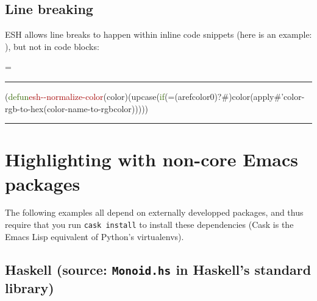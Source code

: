 \documentclass{article}
\makeatletter
\newcommand*{\ESHFontSize}{}
\newcommand*{\ESHFontFamily}{\ttfamily}
\newcommand*{\ESHInlineFontSize}{\ESHFontSize}
\newcommand*{\ESHInlineFontFamily}{\ESHFontFamily}
\newcommand*{\ESHInlineFont}{\ESHInlineFontSize\ESHInlineFontFamily}
\newcommand*{\ESHBlockFontSize}{\ESHFontSize}
\newcommand*{\ESHBlockFontFamily}{\ESHFontFamily}
\newcommand*{\ESHBlockFont}{\ESHBlockFontSize\ESHBlockFontFamily}
\newcommand*{\ESHFallbackFontFamily}{\ESHFontFamily}
\newcommand*{\ESHFallbackFont}{\ESHFallbackFontFamily}
\newcommand*{\ESHNoHyphens}{\hyphenpenalty=10000}
\newcommand*{\ESHConstantSpace}{\spaceskip=\fontdimen2\font\xspaceskip=0pt}
\newcommand*{\ESHCenterInWidthOf}[2]
  {\settowidth\ESHtempdim{#1}%
   \makebox[\ESHtempdim][c]{#2}}
\DeclareRobustCommand*{\ESHText}[1]{\ifmmode{\textnormal{#1}}\else{#1}\fi}
\newcommand*{\ESHIfFontChar}[1]
  {\iffontchar\font`#1{#1}\else{\ESHFallbackFont#1}\fi}
\def\ESHWithFallback#1{\ESHFallbackFont#1}}
\def\ESHWithFallback#1{\ESHIfFontChar{#1}}}}
\def\ESHWithFallback#1{%
     \ifnum\XeTeXfonttype\font>0%
       \ESHIfFontChar{#1}%
     \else%
       \setbox0=\hbox{\tracinglostchars=0\kern1sp#1\expandafter}%
       \ifnum\lastkern=1{\ESHFallbackFont#1}\else{#1}\fi
     \fi}}
\DeclareRobustCommand*{\ESHInlineSpecialChar}[1]
  {{\ESHInlineFontFamily\ESHWithFallback{#1}}}
\DeclareRobustCommand*{\ESHBlockSpecialChar}[1]
  {{\ESHCenterInWidthOf{\ESHBlockFontFamily{a}}{\ESHBlockFontFamily\ESHWithFallback{#1}}}}
\DeclareRobustCommand*{\ESHInlineUnicodeSubstitution}[1]
  {{\ESHInlineFontFamily#1}}
\DeclareRobustCommand*{\ESHBlockUnicodeSubstitution}[1]
  {{\ESHCenterInWidthOf{\ESHBlockFontFamily{a}}{\ESHBlockFontFamily#1}}}
\newlength{\ESHCurFontSize}
\newcommand*{\ESHSetCurFontSize}{\setlength{\ESHCurFontSize}{\f@size pt}}
\DeclareRobustCommand*{\ESHInlineRaise}[2]
  {\ESHSetCurFontSize\raisebox{#1\ESHCurFontSize}{\relsize{-2}#2}}
\DeclareRobustCommand*{\ESHBlockRaise}[2]
  {\rlap{\ESHInlineRaise{#1}{#2}}\hphantom{#2}}
\newlength{\ESHBaselineskip}
\DeclareRobustCommand*{\ESHBlockStrut}[1]
  {\rule{0pt}{#1\ESHBaselineskip}}
\newcommand*{\ESHInlineSlantItalic}[1]{\textit{#1}}
\newcommand*{\ESHBlockSlantItalic}[1]{{\itshape{#1}}} %
\newcommand*{\ESHBreakingSpace}{\ }
\newcommand*{\ESHNonbreakingSpace}{\nobreakspace}
\let\ESHSpecialChar\ignorespaces%
\let\ESHUnicodeSubstitution\ignorespaces%
\let\ESHRaise\ignorespaces%
\let\ESHBol\ignorespaces%
\let\ESHEol\ignorespaces%
\let\ESHSpace\ignorespaces%
\let\ESHDash\ignorespaces%
\let\ESHSlantItalic\ignorespaces%
\DeclareRobustCommand*{\ESHInlineInternalSetup}
  {\def\ESHSpecialChar{\ESHInlineSpecialChar}\def\ESHUnicodeSubstitution{\ESHInlineUnicodeSubstitution}%
   \def\ESHRaise{\ESHInlineRaise}\def\ESHSlantItalic{\ESHInlineSlantItalic}%
   \def\ESHStrut{\relax}\def\ESHBol{\relax}\def\ESHEol{\newline}\def\ESHSpace{\ESHBreakingSpace}%
   \def\ESHDash{-}}
\DeclareRobustCommand*{\ESHBlockInternalSetup}
  {\def\ESHSpecialChar{\ESHBlockSpecialChar}\def\ESHUnicodeSubstitution{\ESHBlockUnicodeSubstitution}%
   \def\ESHRaise{\ESHBlockRaise}\def\ESHSlantItalic{\ESHBlockSlantItalic}%
   \setlength{\ESHBaselineskip}{\baselineskip}\def\ESHStrut{\ESHBlockStrut}%
   \def\ESHBol{\-}\def\ESHEol{\newline}\def\ESHSpace{\ESHNonbreakingSpace}\def\ESHDash{\hbox{-}\nobreak}}
\newcommand*{\ESHInlineBasicSetup}
  {\leavevmode\ESHNoHyphens\ESHInlineFont}
\newcommand*{\ESHBlockBasicSetup}
  {\setlength{\parindent}{0pt}\raggedright\ESHNoHyphens%
   \ESHBlockFont\ESHConstantSpace}
\newcommand*{\ESHHook}{}
\newcommand*{\ESHInlineHook}{\ESHHook}
\newcommand*{\ESHBlockHook}{\ESHHook}
\DeclareRobustCommand*{\ESHInline}[1]
  {\bgroup\ESHText{\ESHInlineInternalSetup\ESHInlineBasicSetup\ESHInlineHook#1}\egroup}
\newlength{\ESHSkip}
\newcommand*{\ESHNoBreakAddVSpace}[1]{\addpenalty{\@M}\addvspace{#1}}
\newenvironment{ESHBlock}
  {\par\ESHNoBreakAddVSpace{\ESHSkip}\bgroup\ESHBlockInternalSetup\ESHBlockBasicSetup\ESHBlockHook}
  {\par\egroup\addvspace{\ESHSkip}}
\renewcommand{\ESHFontFamily}{\UbuntuMono}
\renewcommand{\ESHFallbackFontFamily}{\XITSMath}
\newcommand{\angles}[1]{$\langle\,$#1$\,\rangle$}
\DeclareRobustCommand*{\ESHInline}[1]
  {{\ESHText{\ESHInlineInternalSetup\ESHInlineBasicSetup\angles{#1}}}}
\renewenvironment{ESHBlock}{%
  \par\ESHNoBreakAddVSpace{\ESHSkip}\bgroup\ESHBlockInternalSetup\ESHBlockBasicSetup%
  \hrule\addvspace{0.5em}%
}{%
  \par\egroup\addvspace{0.5em}\hrule\addvspace{2\ESHSkip}%
}
\makeatother
\begin{document}
\subsection*{Line breaking}

ESH allows line breaks to happen within inline code snippets (here is an example: \ESHInline{\ESHBol{}\textcolor[HTML]{346604}{private}\ESHSpace{}\textcolor[HTML]{346604}{static}\ESHSpace{}\textcolor[HTML]{346604}{volatile}\ESHSpace{}\textcolor[HTML]{204A87}{int}\ESHSpace{}\textcolor[HTML]{B35000}{counter}\ESHSpace{}=\ESHSpace{}0}), but not in code blocks:

\begin{ESHBlock}
\ESHBol{}(\textcolor[HTML]{346604}{defun}\ESHSpace{}\textcolor[HTML]{A40000}{esh\ESHDash{}\ESHDash{}normalize\ESHDash{}color}\ESHSpace{}(color)\ESHSpace{}(upcase\ESHSpace{}(\textcolor[HTML]{346604}{if}\ESHSpace{}(=\ESHSpace{}(aref\ESHSpace{}color\ESHSpace{}0)\ESHSpace{}?\#)\ESHSpace{}color\ESHSpace{}(apply\ESHSpace{}\#{'}color\ESHDash{}rgb\ESHDash{}to\ESHDash{}hex\ESHSpace{}(color\ESHDash{}name\ESHDash{}to\ESHDash{}rgb\ESHSpace{}color)))))
\end{ESHBlock}


\section*{Highlighting with non-core Emacs packages}

The following examples all depend on externally developped packages, and thus
require that you run \texttt{cask install} to install these dependencies (Cask
is the Emacs Lisp equivalent of Python's virtualenvs).

\subsection*{Haskell (source: \texttt{Monoid.hs} in Haskell's standard library)}
\end{document}
